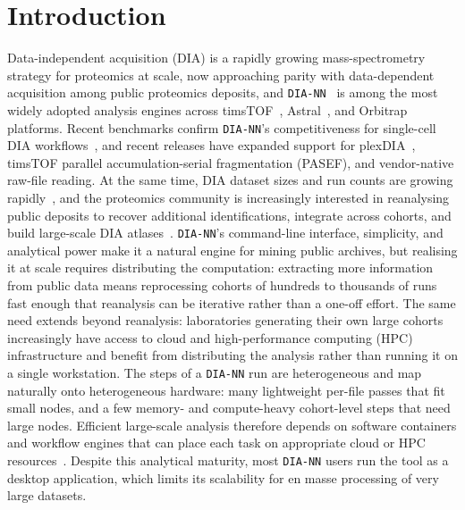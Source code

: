 \documentclass[preprint,12pt]{elsarticle}
\begin{document}
\section{Introduction}
\label{sec:introduction}
Data-independent acquisition (DIA) is a rapidly growing mass-spectrometry strategy for proteomics at scale, now approaching parity with data-dependent acquisition among public proteomics deposits, and \texttt{DIA-NN}~\cite{demichev2020} is among the most widely adopted analysis engines across timsTOF~\cite{meier2020,brunner2022}, Astral~\cite{bubis2025astral}, and Orbitrap platforms. Recent benchmarks confirm \texttt{DIA-NN}'s competitiveness for single-cell DIA workflows~\cite{wang2025}, and recent releases have expanded support for plexDIA~\cite{derks2023, derks2023strategies}, timsTOF parallel accumulation-serial fragmentation (PASEF), and vendor-native raw-file reading. At the same time, DIA dataset sizes and run counts are growing rapidly~\cite{perezriverol2025pride}, and the proteomics community is increasingly interested in reanalysing public deposits to recover additional identifications, integrate across cohorts, and build large-scale DIA atlases~\cite{dai2024quantms,lautenbacher2022proteomicsdb}.
\texttt{DIA-NN}'s command-line interface, simplicity, and analytical power make it a natural engine for mining public archives, but realising it at scale requires distributing the computation: extracting more information from public data means reprocessing cohorts of hundreds to thousands of runs fast enough that reanalysis can be iterative rather than a one-off effort. The same need extends beyond reanalysis: laboratories generating their own large cohorts increasingly have access to cloud and high-performance computing (HPC) infrastructure and benefit from distributing the analysis rather than running it on a single workstation. The steps of a \texttt{DIA-NN} run are heterogeneous and map naturally onto heterogeneous hardware: many lightweight per-file passes that fit small nodes, and a few memory- and compute-heavy cohort-level steps that need large nodes. Efficient large-scale analysis therefore depends on software containers and workflow engines that can place each task on appropriate cloud or HPC resources~\cite{perezriverol2020scalable}. Despite this analytical maturity, most \texttt{DIA-NN} users run the tool as a desktop application, which limits its scalability for en masse processing of very large datasets.
\end{document}
